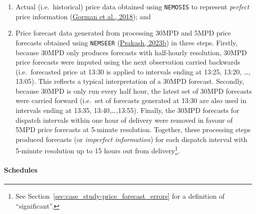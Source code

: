 \documentclass[12pt,a4paper,]{report}
\providecommand{\tightlist}{%
  \setlength{\itemsep}{0pt}\setlength{\parskip}{0pt}}
\begin{document}
\begin{enumerate}
\def\labelenumi{\arabic{enumi}.}
\tightlist
\item
  Actual (i.e.~historical) price data obtained using \texttt{NEMOSIS} to
  represent \emph{perfect} price information
  (\protect\hyperlink{ref-gormanNEMOSISNEMOpen2018}{Gorman et al.,
  2018}); and
\item
  Price forecast data generated from processing 30MPD and 5MPD price
  forecasts obtained using \texttt{NEMSEER}
  (\protect\hyperlink{ref-prakashNEMSEER2023}{Prakash, 2023b}) in three
  steps. Firstly, because 30MPD only produces forecasts with half-hourly
  resolution, 30MPD price forecasts were imputed using the next
  observation carried backwards (i.e.~forecasted price at 13:30 is
  applied to intervals ending at 13:25, 13:20, \ldots, 13:05). This
  reflects a typical interpretation of a 30MPD forecast. Secondly,
  because 30MPD is only run every half hour, the latest set of 30MPD
  forecasts were carried forward (i.e.~set of forecasts generated at
  13:30 are also used in intervals ending at 13:35, 13:40,\ldots,13:55).
  Finally, the 30MPD forecasts for dispatch intervals within one hour of
  delivery were removed in favour of 5MPD price forecasts at 5-minute
  resolution. Together, these processing steps produced forecasts (or
  \emph{imperfect information}) for each dispatch interval with 5-minute
  resolution up to 15 hours out from delivery\footnote{See
    Section~\ref{sec:case_study-price_forecast_errors} for a definition
    of ``significant''.}.
\end{enumerate}

\hypertarget{schedules}{%
\paragraph{Schedules}\label{schedules}}
\end{document}
